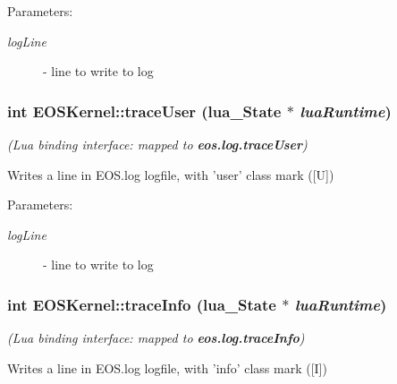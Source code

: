 \begin{Desc}
\item[Parameters:]
\begin{description}
\item[{\em logLine}]- line to write to log \end{description}
\end{Desc}
\hypertarget{structEOSKernel_29224ae2d81261b6f4d859f6dfcde468}{
\subsubsection[{traceUser}]{\setlength{\rightskip}{0pt plus 5cm}int EOSKernel::traceUser (lua\_\-State $\ast$ {\em luaRuntime})}}
\label{structEOSKernel_29224ae2d81261b6f4d859f6dfcde468}


{\em (Lua binding interface: mapped to {\bf eos.log.traceUser})\/}\par
\par
 Writes a line in EOS.log logfile, with 'user' class mark (\mbox{[}U\mbox{]}) 

\begin{Desc}
\item[Parameters:]
\begin{description}
\item[{\em logLine}]- line to write to log \end{description}
\end{Desc}
\hypertarget{structEOSKernel_dfbb944ca4916e758c9e3ada4c3f3644}{
\subsubsection[{traceInfo}]{\setlength{\rightskip}{0pt plus 5cm}int EOSKernel::traceInfo (lua\_\-State $\ast$ {\em luaRuntime})}}
\label{structEOSKernel_dfbb944ca4916e758c9e3ada4c3f3644}


{\em (Lua binding interface: mapped to {\bf eos.log.traceInfo})\/}\par
\par
 Writes a line in EOS.log logfile, with 'info' class mark (\mbox{[}I\mbox{]}) 

